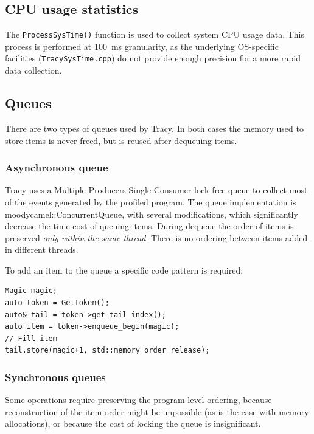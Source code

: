 \documentclass[hidelinks,titlepage,a4paper]{article}
\begin{document}
\subsection{CPU usage statistics}

The \texttt{ProcessSysTime()} function is used to collect system CPU usage data. This process is performed at 100~\si{\milli\second} granularity, as the underlying OS-specific facilities (\texttt{TracySysTime.cpp}) do not provide enough precision for a more rapid data collection.

\subsection{Queues}

There are two types of queues used by Tracy. In both cases the memory used to store items is never freed, but is reused after dequeuing items.

\subsubsection{Asynchronous queue}

Tracy uses a Multiple Producers Single Consumer lock-free queue to collect most of the events generated by the profiled program. The queue implementation is moodycamel::ConcurrentQueue, with several modifications, which significantly decrease the time cost of queuing items. During dequeue the order of items is preserved \emph{only within the same thread}. There is no ordering between items added in different threads.

To add an item to the queue a specific code pattern is required:

\begin{lstlisting}
Magic magic;
auto token = GetToken();
auto& tail = token->get_tail_index();
auto item = token->enqueue_begin(magic);
// Fill item
tail.store(magic+1, std::memory_order_release);
\end{lstlisting}

\subsubsection{Synchronous queues}

Some operations require preserving the program-level ordering, because reconstruction of the item order might be impossible (as is the case with memory allocations), or because the cost of locking the queue is insignificant.
\end{document}
